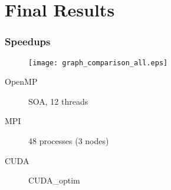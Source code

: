 \section{Final Results}


\begin{frame}
	\frametitle{Speedups}
	\begin{figure}
		\centering
		\texttt{[image: graph\_comparison\_all.eps]}
	\end{figure}
	\begin{description}
		\item [OpenMP] SOA, 12 threads
		\item [MPI] 48 processes (3 nodes)
		\item [CUDA] CUDA\_optim
	\end{description}
\end{frame}
